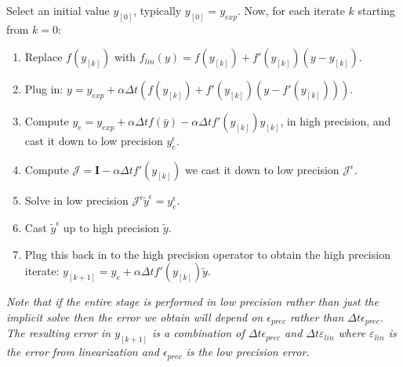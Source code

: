 \documentclass{siamart251104}
\newcommand{\dt}{\Delta t}
\newcommand{\m}[1]{\mathbf{#1}}
\newcommand{\mI}{\m{I}}
\begin{document}
\begin{framed}
Select an initial value $y_{[0]}$, typically  
    $y_{[0]} = y_{exp}$. Now, for each iterate $k$ starting from $k=0$:
\begin{enumerate}
\item Replace $f(y_{[k]})$ with  
   $ f_{lin}(y) = f(y_{[k]}) +  f'(y_{[k]}) \left( y - y_{[k]} \right) .$
\item Plug in:
    $ y = y_{exp} + \alpha \dt \left(  f(y_{[k]}) +  
    f'(y_{[k]}) \left( y - f'(y_{[k]}) \right) \right). $
\item Compute 
    $y_{e} = y_{exp} + \alpha \dt f(\bar{y}) - \alpha \dt f'(y_{[k]}) y_{[k]}$,
    in high precision,  and cast it down to low precision $y_{e}^\epsilon$.
\item   Compute $\mathcal{J} =  \mI - \alpha \dt f'(y_{[k]}) $
    we cast it down to low precision  $\mathcal{J}^\epsilon$.
\item   Solve in low precision 
    $ \mathcal{J}^\epsilon \tilde{y}^\epsilon = y_{e}^\epsilon .$
\item  Cast  $\tilde{y}^\epsilon$ up to high precision $\tilde{y}$.
\item Plug this back in to the high precision operator to obtain the high precision iterate:
    $y_{[k+1]} = y_{e} + \alpha \dt f'(y_{[k]})\tilde{y} .$
\end{enumerate}
{\em Note that if the entire stage is performed in low precision rather than 
just the implicit solve then the error we obtain will depend on 
$\epsilon_{prec}$ rather than $\dt \epsilon_{prec}$.
The resulting error in $y_{[k+1]}$ is a combination of  $\dt \epsilon_{prec}$ and  $\dt \varepsilon_{lin}$ where $\varepsilon_{lin}$ is the error from linearization 
and $\epsilon_{prec}$ is the low precision error.}
\end{framed}
\end{document}
